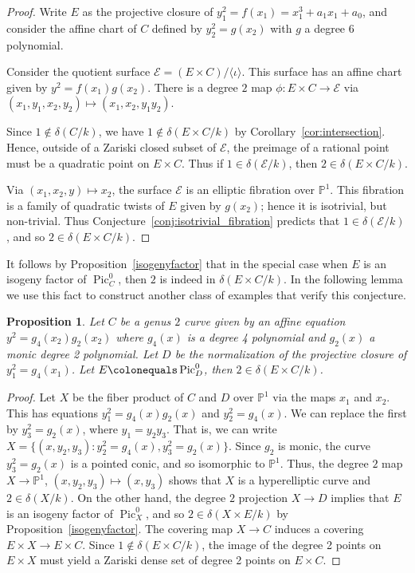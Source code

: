 \documentclass[a4paper,11pt]{amsart}
\theoremstyle{plain}
\newtheorem{prop}[thm]{Proposition}
\theoremstyle{remark}
\renewcommand{\P}{\mathbb{P}}
\newcommand{\pp}{\mathbb{P}}
\newcommand{\Pic}{\operatorname{Pic}}
\newcommand{\dendegs}{\delta}
\begin{document}
\begin{proof}
    Write $E$ as the projective closure of $y_1^2=f(x_1) = x_1^3 + a_1x_1 + a_0$, and consider the affine chart of $C$ defined by $y_2^2=g(x_2)$ with $g$ a degree $6$ polynomial.
    
    Consider the quotient surface $\mathcal{E}=(E\times C)/\langle\iota\rangle$. This surface has an affine chart given by $y^2 = f(x_1)g(x_2)$. There is a degree \(2\) map $\phi \colon E \times C \to \mathcal{E}$ via $(x_1, y_1, x_2, y_2) \mapsto (x_1, x_2, y_1 y_2)$. 
    
    Since \(1 \not\in \dendegs(C/k)\), we have $1 \notin \dendegs(E \times C / k)$ by Corollary~\ref{cor:intersection}.  Hence, outside of a Zariski closed subset of \(\mathcal{E}\), the preimage of a rational point must be a quadratic point on \(E \times C\).  Thus if $1 \in \dendegs(\mathcal{E} / k)$, then $2 \in \dendegs(E \times C / k)$. 
    
    Via \((x_1, x_2, y) \mapsto x_2\), the surface $\mathcal{E}$ is an elliptic fibration over \(\P^1\).  This fibration is a family of quadratic twists of \(E\) given by \(g(x_2)\); hence it is isotrivial, but non-trivial. Thus Conjecture~\ref{conj:isotrivial_fibration} predicts that \(1 \in \dendegs(\mathcal{E}/k)\), and so \(2 \in \dendegs(E \times C/k)\).
\end{proof} 

It follows by Proposition~\ref{isogenyfactor} that in the special case when $E$ is an isogeny factor of $\Pic^0_C$, then $2$ is indeed in $\dendegs(E\times C/k)$. In the following lemma we use this fact to construct another class of examples that verify this conjecture.

\begin{prop}\label{lem:quad_24} Let $C$ be a genus $2$ curve given by an affine equation $y^2=g_4(x_2)g_2(x_2)$ where $g_4(x)$ is a degree 4 polynomial and $g_2(x)$ a monic degree 2 polynomial. Let $D$ be the normalization of the projective closure of $y_1^2=g_4(x_1)$. Let \(E \colonequals \Pic^0_D\), then $2\in \dendegs(E\times C/k)$.
 \end{prop}
\begin{proof}
     Let $X$ be the fiber product of $C$ and $D$ over \(\pp^1\) via the maps $x_1$ and $x_2$. This has equations $y_1^2 = g_4(x)g_2(x)$ and $y_2^2 = g_4(x)$. We can replace the first by $y_3^2 = g_2(x)$, where $y_1 = y_2y_3$. That is, we can write $X=\{(x,y_2,y_3): y_2^2 = g_4(x), y_3^2= g_2(x)\}$. Since $g_2$ is monic, the curve $y_3^2 = g_2(x)$ is a pointed conic, and so isomorphic to $\P^1$. Thus, the degree \(2\) map $X\to\mathbb{P}^1$, $(x,y_2,y_3)\mapsto (x,y_3)$  shows that $X$ is a hyperelliptic curve and $2 \in \dendegs(X / k)$. On the other hand, the degree \(2\) projection $X\to D$ implies that $E$ is an isogeny factor of $\Pic^0_X$, and so $2 \in \dendegs(X \times E / k)$ by Proposition~\ref{isogenyfactor}. The covering map $X \to C$ induces a covering $E \times X \to E \times C$. Since $1 \notin \dendegs(E \times C/k)$, the image of the degree 2 points on $E \times X$ must yield a Zariski dense set of degree 2 points on $E \times C$.
\end{proof}
\end{document}
